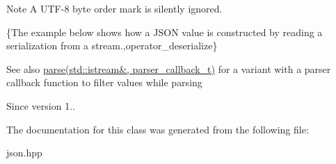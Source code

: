 \begin{DoxyNote}{Note}
A U\+T\+F-\/8 byte order mark is silently ignored.
\end{DoxyNote}
\{The example below shows how a J\+S\+ON value is constructed by reading a serialization from a stream.,operator\+\_\+deserialize\}

\begin{DoxySeeAlso}{See also}
\hyperlink{a00025_a13c4d2ab4e7ee2f92be785a7b12948ff}{parse(std\+::istream\&, parser\+\_\+callback\+\_\+t)} for a variant with a parser callback function to filter values while parsing
\end{DoxySeeAlso}
\begin{DoxySince}{Since}
version 1.. 
\end{DoxySince}


The documentation for this class was generated from the following file\+:\begin{DoxyCompactItemize}
\item 
json.\+hpp\end{DoxyCompactItemize}
